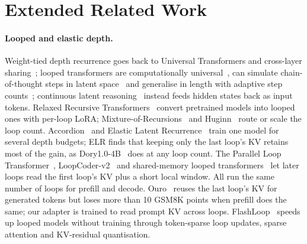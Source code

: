 \documentclass[11pt]{article}
\begin{document}
\section{Extended Related Work}
\label{app:related}


\paragraph{Looped and elastic depth.} Weight-tied depth recurrence goes back to Universal Transformers and
cross-layer sharing~\citep{ut,albert}; looped transformers are computationally universal~\citep{giannou2023looped},
can simulate chain-of-thought steps in latent space~\citep{saunshi2025latent} and generalise in length with adaptive
step counts~\citep{loopedlengthgen}; continuous latent reasoning~\citep{coconut} instead feeds hidden states back as
input tokens. Relaxed
Recursive Transformers~\citep{relaxedrecursive} convert pretrained models into looped ones with per-loop LoRA;
Mixture-of-Recursions~\citep{mor} and Huginn~\citep{huginn} route or scale the loop count. Accordion~\citep{accordion} and Elastic Latent Recurrence~\citep{elr} train one
model for several depth budgets; ELR finds that keeping only the last loop's KV retains most of the gain, as Dory1.0-4B~\citep{dory} does at any loop count. The
Parallel Loop Transformer~\citep{plt}, LoopCoder-v2~\citep{loopcoder2} and shared-memory looped
transformers~\citep{sharedmem} let later loops read the first loop's KV plus a short local window. All run the same
number of loops for prefill and decode. Ouro~\citep{ouro} reuses the last loop's KV for generated tokens but loses
more than 10 GSM8K points when prefill does the same; our adapter is trained to read prompt KV across loops. FlashLoop~\citep{flashloop}
speeds up looped models without training through token-sparse loop updates, sparse attention and KV-residual quantisation.
\end{document}
